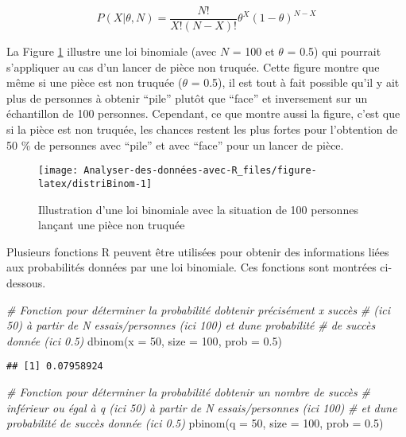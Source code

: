 \documentclass[
]{book}
\newenvironment{Shaded}{\begin{snugshade}}{\end{snugshade}}
\newcommand{\AttributeTok}[1]{\textcolor[rgb]{0.77,0.63,0.00}{#1}}
\newcommand{\CommentTok}[1]{\textcolor[rgb]{0.56,0.35,0.01}{\textit{#1}}}
\newcommand{\DecValTok}[1]{\textcolor[rgb]{0.00,0.00,0.81}{#1}}
\newcommand{\FloatTok}[1]{\textcolor[rgb]{0.00,0.00,0.81}{#1}}
\newcommand{\FunctionTok}[1]{\textcolor[rgb]{0.00,0.00,0.00}{#1}}
\newcommand{\NormalTok}[1]{#1}
\begin{document}
\[P(X | \theta, N) = \frac{N!}{X!(N-X)!}\theta^X(1-\theta)^{N-X}\]

La Figure \ref{fig:distriBinom} illustre une loi binomiale (avec \(N\) = 100 et \(\theta\) = 0.5) qui pourrait s'appliquer au cas d'un lancer de pièce non truquée. Cette figure montre que même si une pièce est non truquée (\(\theta\) = 0.5), il est tout à fait possible qu'il y ait plus de personnes à obtenir ``pile'' plutôt que ``face'' et inversement sur un échantillon de 100 personnes. Cependant, ce que montre aussi la figure, c'est que si la pièce est non truquée, les chances restent les plus fortes pour l'obtention de 50 \% de personnes avec ``pile'' et avec ``face'' pour un lancer de pièce.

\begin{figure}

{\centering \texttt{[image: Analyser-des-données-avec-R\_files/figure-latex/distriBinom-1]} 

}

\caption{Illustration d'une loi binomiale avec la situation de 100 personnes lançant une pièce non truquée}\label{fig:distriBinom}
\end{figure}

Plusieurs fonctions R peuvent être utilisées pour obtenir des informations liées aux probabilités données par une loi binomiale. Ces fonctions sont montrées ci-dessous.

\begin{Shaded}
\begin{Highlighting}[]
\CommentTok{\# Fonction pour déterminer la probabilité d\textquotesingle{}obtenir précisément x succès }
\CommentTok{\# (ici 50) à partir de N essais/personnes (ici 100) et d\textquotesingle{}une probabilité }
\CommentTok{\# de succès donnée (ici 0.5)}
\FunctionTok{dbinom}\NormalTok{(}\AttributeTok{x =} \DecValTok{50}\NormalTok{, }\AttributeTok{size =} \DecValTok{100}\NormalTok{, }\AttributeTok{prob =} \FloatTok{0.5}\NormalTok{)}
\end{Highlighting}
\end{Shaded}

\begin{verbatim}
## [1] 0.07958924
\end{verbatim}

\begin{Shaded}
\begin{Highlighting}[]
\CommentTok{\# Fonction pour déterminer la probabilité d\textquotesingle{}obtenir un nombre de succès}
\CommentTok{\# inférieur ou égal à q (ici 50) à partir de N essais/personnes (ici 100) }
\CommentTok{\# et d\textquotesingle{}une probabilité de succès donnée (ici 0.5)}
\FunctionTok{pbinom}\NormalTok{(}\AttributeTok{q =} \DecValTok{50}\NormalTok{, }\AttributeTok{size =} \DecValTok{100}\NormalTok{, }\AttributeTok{prob =} \FloatTok{0.5}\NormalTok{)}
\end{Highlighting}
\end{Shaded}
\end{document}
